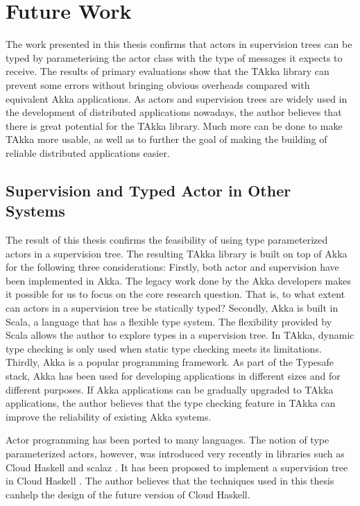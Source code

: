\chapter{Future Work}
\label{future_work}

The work presented in this thesis confirms that actors in supervision trees can
be typed by parameterising the actor class with the type of messages it expects
to receive. The results of primary evaluations show that the TAkka library 
can prevent some errors without bringing obvious overheads compared with 
equivalent Akka applications. As actors and supervision trees are widely used 
in the development of distributed applications nowadays, the author believes 
that there is great potential for the TAkka library. Much more can be done to 
make TAkka more usable, as well as to further the goal of making the building 
of reliable distributed applications easier.


\section{Supervision and Typed Actor in Other Systems}

The result of this thesis confirms the feasibility of using type parameterized 
actors in a supervision tree.  The resulting TAkka library is built on top of 
Akka for the following three considerations:  Firstly, both actor and 
supervision have been implemented in Akka.  The legacy work done by the Akka 
developers makes it possible for us to focus on the core research question. 
That is, to what extent can actors in a supervision tree be statically typed?  
Secondly, Akka is 
built in Scala, a language that has a flexible type system.  The flexibility 
provided by Scala allows the author to explore types in a supervision tree.  In 
TAkka, dynamic type checking is only used when static type checking meets its 
limitations. Thirdly, Akka is a popular programming framework.  As part of the 
Typesafe stack, Akka has been used for developing applications in different 
sizes and for different purposes.  If Akka applications can be gradually 
upgraded to TAkka applications, the author believes that the type checking 
feature in TAkka can improve the reliability of existing Akka systems.

Actor programming has been ported to many languages.  The notion of type 
parameterized actors, however, was introduced very recently in libraries such 
as Cloud Haskell \citep{CloudHaskell} and scalaz \citep{scalaz}.  It has been 
proposed to implement a supervision tree in Cloud Haskell 
\citep{OTPCloudHaskell}.  The author believes that the techniques used in this 
thesis canhelp the design of the future version of Cloud Haskell.



